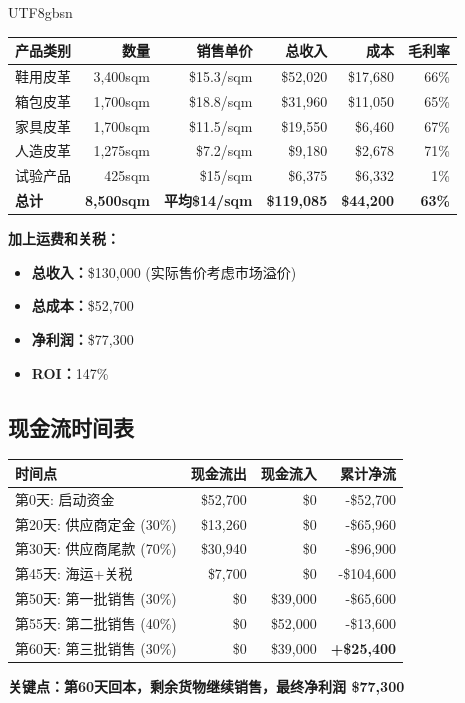 \documentclass[12pt,a4paper]{article}
\begin{document}
\begin{CJK}{UTF8}{gbsn}
\begin{center}
\begin{longtable}{lrrrrr}
\toprule
\textbf{产品类别} & \textbf{数量} & \textbf{销售单价} & \textbf{总收入} & \textbf{成本} & \textbf{毛利率} \\
\midrule
鞋用皮革 & 3,400sqm & \$15.3/sqm & \$52,020 & \$17,680 & 66\% \\
箱包皮革 & 1,700sqm & \$18.8/sqm & \$31,960 & \$11,050 & 65\% \\
家具皮革 & 1,700sqm & \$11.5/sqm & \$19,550 & \$6,460 & 67\% \\
人造皮革 & 1,275sqm & \$7.2/sqm & \$9,180 & \$2,678 & 71\% \\
试验产品 & 425sqm & \$15/sqm & \$6,375 & \$6,332 & 1\% \\
\midrule
\textbf{总计} & \textbf{8,500sqm} & \textbf{平均\$14/sqm} & \textbf{\$119,085} & \textbf{\$44,200} & \textbf{63\%} \\
\bottomrule
\end{longtable}
\end{center}

\textbf{加上运费和关税：}
\begin{itemize}
    \item \textbf{总收入：}\$130,000 (实际售价考虑市场溢价)
    \item \textbf{总成本：}\$52,700
    \item \textbf{净利润：}\$77,300
    \item \textbf{ROI：}147\%
\end{itemize}

\subsection{现金流时间表}

\begin{center}
\begin{longtable}{lrrr}
\toprule
\textbf{时间点} & \textbf{现金流出} & \textbf{现金流入} & \textbf{累计净流} \\
\midrule
第0天: 启动资金 & \$52,700 & \$0 & -\$52,700 \\
第20天: 供应商定金 (30\%) & \$13,260 & \$0 & -\$65,960 \\
第30天: 供应商尾款 (70\%) & \$30,940 & \$0 & -\$96,900 \\
第45天: 海运+关税 & \$7,700 & \$0 & -\$104,600 \\
第50天: 第一批销售 (30\%) & \$0 & \$39,000 & -\$65,600 \\
第55天: 第二批销售 (40\%) & \$0 & \$52,000 & -\$13,600 \\
第60天: 第三批销售 (30\%) & \$0 & \$39,000 & \textbf{+\$25,400} \\
\bottomrule
\end{longtable}
\end{center}

\textbf{关键点：第60天回本，剩余货物继续销售，最终净利润 \$77,300}

\end{CJK}
\end{document}
